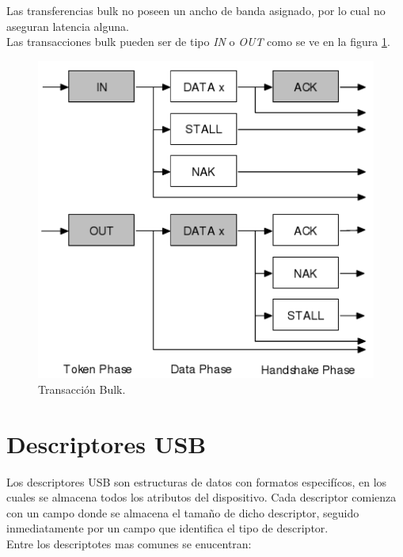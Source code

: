 Las transferencias bulk no poseen un ancho de banda asignado, por lo cual no
aseguran latencia alguna.\\

Las transacciones bulk pueden ser de tipo \emph{IN} o \emph{OUT} como se ve en
la figura \ref{fig:usb_bulk_transaction}.

\begin{figure}
\centering
\includegraphics[scale=0.5]{./img/usb_bulk_transaction.png}
\caption{Transacci\'on Bulk.}
\label{fig:usb_bulk_transaction}
\end{figure}


\section{Descriptores USB}
Los descriptores USB son estructuras de datos con formatos especif\'icos, en
los cuales se almacena todos los atributos del dispositivo.
Cada descriptor comienza con un campo donde se almacena el tama\~no de dicho
descriptor, seguido inmediatamente por un campo que identifica el tipo de
descriptor.\\
Entre los descriptotes mas comunes se enucentran:


